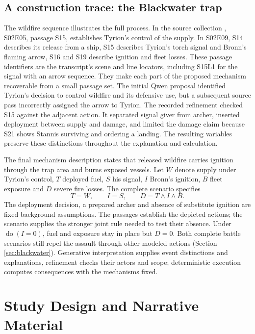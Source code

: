 \documentclass{svproc}
\newcommand{\doop}{\operatorname{do}}
\newcommand{\ep}[1]{\textup{#1}}
\begin{document}
\subsection{A construction trace: the Blackwater trap}\label{sec:construction}
The wildfire sequence illustrates the full process. In the source collection \cite{screenscripts}, \ep{S02E05}, passage S15, establishes Tyrion's control of the supply. In \ep{S02E09}, S14 describes its release from a ship, S15 describes Tyrion's torch signal and Bronn's flaming arrow, S16 and S19 describe ignition and fleet losses. These passage identifiers are the transcript's scene and line locators, including S15L1 for the signal with an arrow sequence. They make each part of the proposed mechanism recoverable from a small passage set.
The initial Qwen proposal identified Tyrion's decision to control wildfire and its defensive use, but a subsequent source pass incorrectly assigned the arrow to Tyrion. The recorded refinement checked S15 against the adjacent action. It separated signal giver from archer, inserted deployment between supply and damage, and limited the damage claim because S21 shows Stannis surviving and ordering a landing. The resulting variables preserve these distinctions throughout the explanation and calculation.

The final mechanism description states that released wildfire carries ignition through the trap area and burns exposed vessels. Let $W$ denote supply under Tyrion's control, $T$ deployed fuel, $S$ his signal, $I$ Bronn's ignition, $B$ fleet exposure and $D$ severe fire losses. The complete scenario specifies
\begin{equation}\label{eq:blackwater}
 T=W,\qquad I=S,\qquad D=T\land I\land B.
\end{equation}
The deployment decision, a prepared archer and absence of substitute ignition are fixed background assumptions. The passages establish the depicted actions; the scenario supplies the stronger joint rule needed to test their absence. Under $\doop(I=0)$, fuel and exposure stay in place but $D=0$. Both complete battle scenarios still repel the assault through other modeled actions (Section \ref{sec:blackwater}). Generative interpretation supplies event distinctions and explanations, refinement checks their actors and scope; deterministic execution computes consequences with the mechanisms fixed.

\section{Study Design and Narrative Material}\label{sec:design}
\end{document}
